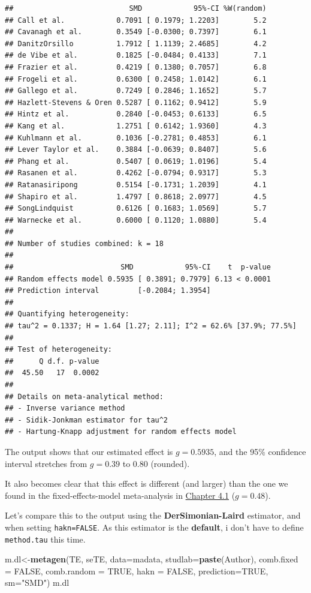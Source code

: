 \documentclass[]{book}
\newenvironment{Shaded}{\begin{snugshade}}{\end{snugshade}}
\newcommand{\DataTypeTok}[1]{\textcolor[rgb]{0.13,0.29,0.53}{#1}}
\newcommand{\KeywordTok}[1]{\textcolor[rgb]{0.13,0.29,0.53}{\textbf{#1}}}
\newcommand{\NormalTok}[1]{#1}
\newcommand{\OtherTok}[1]{\textcolor[rgb]{0.56,0.35,0.01}{#1}}
\newcommand{\StringTok}[1]{\textcolor[rgb]{0.31,0.60,0.02}{#1}}
\begin{document}
\begin{verbatim}
##                           SMD            95%-CI %W(random)
## Call et al.            0.7091 [ 0.1979; 1.2203]        5.2
## Cavanagh et al.        0.3549 [-0.0300; 0.7397]        6.1
## DanitzOrsillo          1.7912 [ 1.1139; 2.4685]        4.2
## de Vibe et al.         0.1825 [-0.0484; 0.4133]        7.1
## Frazier et al.         0.4219 [ 0.1380; 0.7057]        6.8
## Frogeli et al.         0.6300 [ 0.2458; 1.0142]        6.1
## Gallego et al.         0.7249 [ 0.2846; 1.1652]        5.7
## Hazlett-Stevens & Oren 0.5287 [ 0.1162; 0.9412]        5.9
## Hintz et al.           0.2840 [-0.0453; 0.6133]        6.5
## Kang et al.            1.2751 [ 0.6142; 1.9360]        4.3
## Kuhlmann et al.        0.1036 [-0.2781; 0.4853]        6.1
## Lever Taylor et al.    0.3884 [-0.0639; 0.8407]        5.6
## Phang et al.           0.5407 [ 0.0619; 1.0196]        5.4
## Rasanen et al.         0.4262 [-0.0794; 0.9317]        5.3
## Ratanasiripong         0.5154 [-0.1731; 1.2039]        4.1
## Shapiro et al.         1.4797 [ 0.8618; 2.0977]        4.5
## SongLindquist          0.6126 [ 0.1683; 1.0569]        5.7
## Warnecke et al.        0.6000 [ 0.1120; 1.0880]        5.4
## 
## Number of studies combined: k = 18
## 
##                         SMD            95%-CI    t  p-value
## Random effects model 0.5935 [ 0.3891; 0.7979] 6.13 < 0.0001
## Prediction interval         [-0.2084; 1.3954]              
## 
## Quantifying heterogeneity:
## tau^2 = 0.1337; H = 1.64 [1.27; 2.11]; I^2 = 62.6% [37.9%; 77.5%]
## 
## Test of heterogeneity:
##      Q d.f. p-value
##  45.50   17  0.0002
## 
## Details on meta-analytical method:
## - Inverse variance method
## - Sidik-Jonkman estimator for tau^2
## - Hartung-Knapp adjustment for random effects model
\end{verbatim}

The output shows that our estimated effect is \(g=0.5935\), and the 95\% confidence interval stretches from \(g=0.39\) to \(0.80\) (rounded).

It also becomes clear that this effect is different (and larger) than the one we found in the fixed-effects-model meta-analysis in \protect\hyperlink{fixed}{Chapter 4.1} (\(g=0.48\)).

Let's compare this to the output using the \textbf{DerSimonian-Laird} estimator, and when setting \texttt{hakn=FALSE}. As this estimator is the \textbf{default}, i don't have to define \texttt{method.tau} this time.

\begin{Shaded}
\begin{Highlighting}[]
\NormalTok{m.dl<-}\KeywordTok{metagen}\NormalTok{(TE,}
\NormalTok{        seTE,}
        \DataTypeTok{data=}\NormalTok{madata,}
        \DataTypeTok{studlab=}\KeywordTok{paste}\NormalTok{(Author),}
        \DataTypeTok{comb.fixed =} \OtherTok{FALSE}\NormalTok{,}
        \DataTypeTok{comb.random =} \OtherTok{TRUE}\NormalTok{,}
        \DataTypeTok{hakn =} \OtherTok{FALSE}\NormalTok{,}
        \DataTypeTok{prediction=}\OtherTok{TRUE}\NormalTok{,}
        \DataTypeTok{sm=}\StringTok{"SMD"}\NormalTok{)}
\NormalTok{m.dl}
\end{Highlighting}
\end{Shaded}
\end{document}
